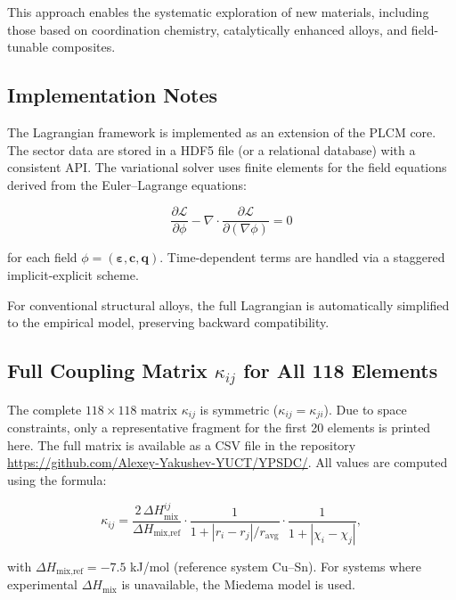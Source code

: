 \documentclass[12pt,a4paper]{article}
\begin{document}
	This approach enables the systematic exploration of new materials, including those based on coordination chemistry, catalytically enhanced alloys, and field-tunable composites.
	
	\subsection{Implementation Notes}
	\label{subsec:implementation}
	
	The Lagrangian framework is implemented as an extension of the PLCM core. The sector data are stored in a HDF5 file (or a relational database) with a consistent API. The variational solver uses finite elements for the field equations derived from the Euler–Lagrange equations:
	
	\[
	\frac{\partial \mathcal{L}}{\partial \phi} - \nabla \cdot \frac{\partial \mathcal{L}}{\partial (\nabla\phi)} = 0
	\]
	
	for each field \(\phi = (\boldsymbol{\varepsilon}, \mathbf{c}, \mathbf{q})\). Time-dependent terms are handled via a staggered implicit-explicit scheme.
	
	For conventional structural alloys, the full Lagrangian is automatically simplified to the empirical model, preserving backward compatibility.
	
	
	
	\subsection{Full Coupling Matrix \(\kappa_{ij}\) for All 118 Elements}
	\label{subsec:full-kappa}
	
	The complete \(118\times118\) matrix \(\kappa_{ij}\) is symmetric (\(\kappa_{ij}=\kappa_{ji}\)). Due to space constraints, only a representative fragment for the first 20 elements is printed here. The full matrix is available as a CSV file in the repository \url{https://github.com/Alexey-Yakushev-YUCT/YPSDC/}. All values are computed using the formula:
	
	\[
	\kappa_{ij} = \frac{2\,\Delta H_{\text{mix}}^{ij}}{\Delta H_{\text{mix,ref}}} \cdot
	\frac{1}{1 + |r_i - r_j|/r_{\text{avg}}} \cdot
	\frac{1}{1 + |\chi_i - \chi_j|},
	\]
	
	with \(\Delta H_{\text{mix,ref}} = -7.5\) kJ/mol (reference system Cu–Sn). For systems where experimental \(\Delta H_{\text{mix}}\) is unavailable, the Miedema model \cite{Miedema1980} is used.
	
\end{document}
